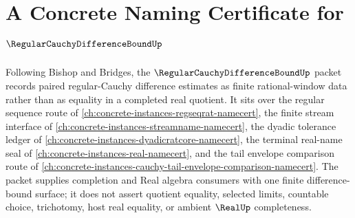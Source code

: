 \chapter{A Concrete Naming Certificate for $\RegularCauchyDifferenceBoundUp$}
\label{ch:concrete-instances-regular-cauchy-difference-bound-namecert}

Following Bishop and Bridges, the $\RegularCauchyDifferenceBoundUp$ packet records paired regular-Cauchy difference estimates as finite rational-window data rather than as equality in a completed real quotient. It sits over the regular sequence route of \autoref{ch:concrete-instances-regseqrat-namecert}, the finite stream interface of \autoref{ch:concrete-instances-streamname-namecert}, the dyadic tolerance ledger of \autoref{ch:concrete-instances-dyadicratcore-namecert}, the terminal real-name seal of \autoref{ch:concrete-instances-real-namecert}, and the tail envelope comparison route of \autoref{ch:concrete-instances-cauchy-tail-envelope-comparison-namecert}. The packet supplies completion and Real algebra consumers with one finite difference-bound surface; it does not assert quotient equality, selected limits, countable choice, trichotomy, host real equality, or ambient $\RealUp$ completeness.

